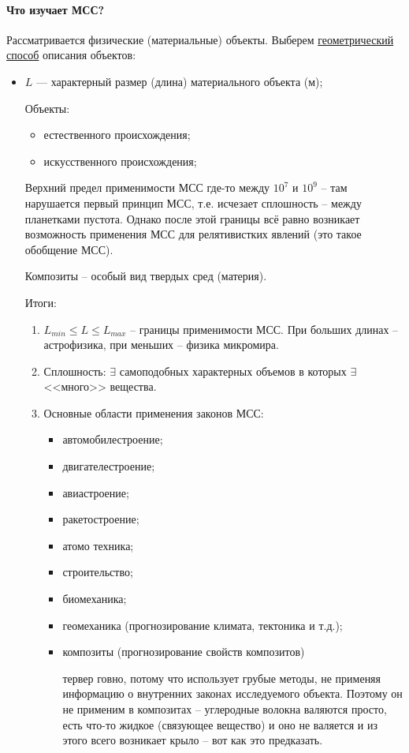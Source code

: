 \paragraph{Что изучает МСС?}
Рассматривается физические (материальные) объекты. Выберем \underline{геометрический способ}
описания объектов:
\begin{itemize}
  \item $L$ --- характерный размер (длина) материального объекта (м);
    
    Объекты:
    \begin{itemize}
      \item естественного происхождения;
      \item искусственного происхождения;
    \end{itemize}

    Верхний предел применимости МСС где-то между $10^7$ и $10^9$ -- там нарушается первый принцип
    МСС, т.е. исчезает сплошность -- между планетками пустота. Однако после этой границы всё равно 
    возникает возможность применения МСС для релятивистких явлений (это такое обобщение МСС).

    Композиты -- особый вид твердых сред (материя).

    Итоги:
    \begin{enumerate}
      \item $L_{min} \leqslant L \leqslant L_{max}$ -- границы применимости МСС. При больших
        длинах -- астрофизика, при меньших -- физика микромира.

      \item Сплошность: $\exists$ самоподобных характерных объемов в которых $\exists$ <<много>>
        вещества.

      \item Основные области применения законов МСС:
        \begin{itemize}
          \item автомобилестроение;
          \item двигателестроение;
          \item авиастроение;
          \item ракетостроение;
          \item атомо техника;
          \item строительство;
          \item биомеханика; %
          \item геомеханика (прогнозирование климата, тектоника и т.д.);
          \item композиты (прогнозирование свойств композитов)

            тервер говно, потому что использует грубые методы, не применяя информацию о внутренних
            законах исследуемого объекта. Поэтому он не применим в композитах -- углеродные волокна 
            валяются просто, есть что-то жидкое (связующее вещество) и оно не валяется и из этого 
            всего возникает крыло -- вот как это предказать.
        \end{itemize}
    \end{enumerate}
\end{itemize}

